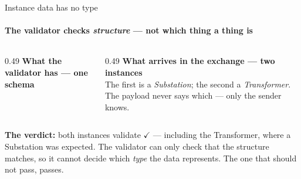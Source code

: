 \begin{frame}{Instance data has no type}
  \framesubtitle{The validator checks \emph{structure} — not which thing a thing is}
  \begin{columns}[T]
    \begin{column}{0.49\textwidth}
      \textbf{What the validator has — one schema}\\[0.4em]
      
    \end{column}
    \begin{column}{0.49\textwidth}
      \textbf{What arrives in the exchange — two instances}\\[0.4em]
      
      \vspace{0.2em}
      \small The first is a \emph{Substation}; the second a \emph{Transformer}.
      The payload never says which — only the sender knows.
    \end{column}
  \end{columns}
  \vspace{0.4em}
  \small
  \textbf{The verdict:} both instances validate \alert{$\checkmark$} —
  including the Transformer, where a Substation was expected.
  The validator can only check that the structure matches, so it cannot decide
  which \emph{type} the data represents. The one that should not pass,
  \alert{passes}.
\end{frame}
